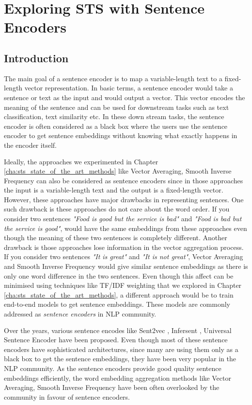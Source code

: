 \chapter{\label{cha:sts_sentence_encoders}Exploring STS with Sentence Encoders}

\section{Introduction}
The main goal of a sentence encoder is to map a variable-length text to a fixed-length vector representation. In basic terms, a sentence encoder would take a sentence or text as the input and would output a vector. This vector encodes the meaning of the sentence and can be used for downstream tasks such as text classification, text similarity etc. In these down stream tasks, the sentence encoder is often considered as a black box where the users use the sentence encoder to get sentence embeddings without knowing what exactly happens in the encoder itself. 

Ideally, the approaches we experimented in Chapter \ref{cha:sts_state_of_the_art_methods} like Vector Averaging, Smooth Inverse Frequency \cite{DBLP:conf/iclr/AroraLM17} can also be considered as sentence encoders since in those approaches the input is a variable-length text and the output is a fixed-length vector. However, these approaches have major drawbacks in representing sentences. One such drawback is these approaches do not care about the word order. If you consider two sentences \textit{"Food is good but the service is bad"} and \textit{"Food is bad but the service is good"}, would have the same embeddings from these approaches even though the meaning of these two sentences is completely different. Another drawback is those approaches lose information in the vector aggregation process. If you consider two sentences \textit{"It is great"} and \textit{"It is not great"}, Vector Averaging and Smooth Inverse Frequency would give similar sentence embeddings as there is only one word difference in the two sentences. Even though this affect can be minimised using techniques like TF/IDF weighting that we explored in Chapter \ref{cha:sts_state_of_the_art_methods}, a different approach would be to train end-to-end models to get sentence embeddings. These models are commonly addressed as \textit{sentence encoders} in NLP community.

Over the years, various sentence encodes like Sent2vec \cite{pagliardini-etal-2018-unsupervised}, Infersent  \cite{cer2018universal}, Universal Sentence Encoder \cite{conneau-EtAl:2017:EMNLP2017} have been proposed. Even though most of these sentence encoders have sophisticated architectures, since many are using them only as a black box to get the sentence embeddings, they have been very popular in the NLP community. As the sentence encoders provide good quality sentence embeddings efficiently, the word embedding aggregation methods like Vector Averaging, Smooth Inverse Frequency have been often overlooked by the community in favour of sentence encoders. 

